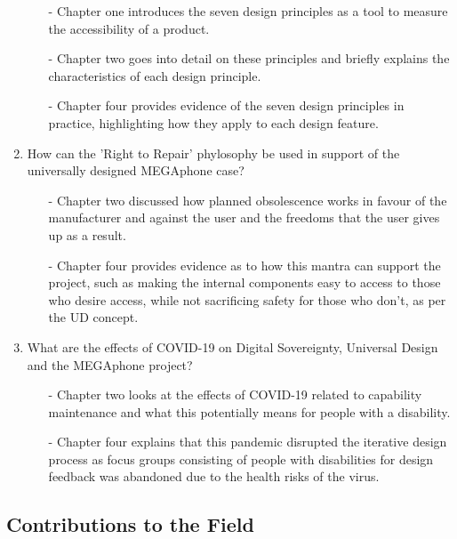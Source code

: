 \begin{enumerate}
        \begin{enumerate}
        \item[-] Chapter one introduces the seven design principles as a tool to measure the accessibility of a product.
        \item[-] Chapter two goes into detail on these principles and briefly explains the characteristics of each design principle.
        \item[-] Chapter four provides evidence of the seven design principles in practice, highlighting how they apply to each design feature.
        \end{enumerate} 
    \item How can the 'Right to Repair' phylosophy be used in support of the universally designed MEGAphone case?
        \begin{enumerate}
        \item[-] Chapter two discussed how planned obsolescence works in favour of the manufacturer and against the user and the freedoms that the user gives up as a result.
        \item[-] Chapter four provides evidence as to how this mantra can support the project, such as making the internal components easy to access to those who desire access, while not sacrificing safety for those who don't, as per the UD concept.
        \end{enumerate} 
    \item What are the effects of COVID-19 on Digital Sovereignty, Universal Design and the MEGAphone project?
        \begin{enumerate}
        \item[-] Chapter two looks at the effects of COVID-19 related to capability maintenance and what this potentially means for people with a disability.
        \item[-] Chapter four explains that this pandemic disrupted the iterative design process as focus groups consisting of people with disabilities for design feedback was abandoned due to the health risks of the virus.
        \end{enumerate} 
\end{enumerate}

\subsection{Contributions to the Field}

